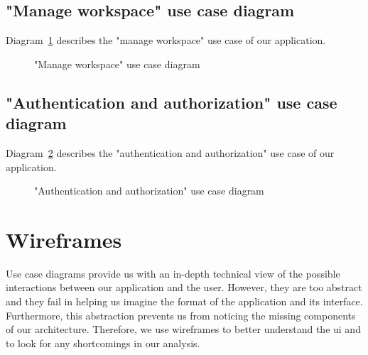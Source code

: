 \subsection{"Manage workspace" use case diagram}
Diagram~\ref{fig:spaces-use-case-diagram} describes the "manage workspace" use case of our application.

\begin{figure}[h]
	\centerfloat

	\caption{"Manage workspace" use case diagram}
	\label{fig:spaces-use-case-diagram}
\end{figure}

\subsection{"Authentication and authorization" use case diagram}
Diagram~\ref{fig:auth-use-case-diagram} describes the "authentication and authorization" use case of our application.

\begin{figure}[h]
	\centerfloat

	\caption{"Authentication and authorization" use case diagram}
	\label{fig:auth-use-case-diagram}
\end{figure}






\section{Wireframes}
Use case diagrams provide us with an in-depth technical view of the possible interactions between our application and the user.
However, they are too abstract and they fail in helping us imagine the format of the application and its interface.
Furthermore, this abstraction prevents us from noticing the missing components of our architecture.
Therefore, we use wireframes to better understand the \acrfull{ui} and to look for any shortcomings in our analysis.

